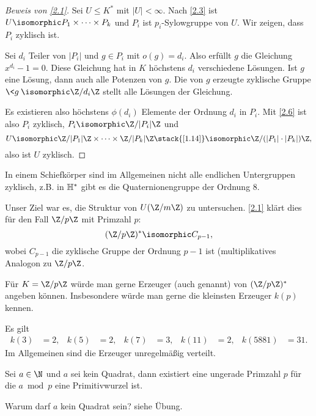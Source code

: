 \begin{proof}[Beweis von \ref{2.1}]
	Sei $U \le K^*$ mit $|U| < \infty$.
	Nach \ref{2.3} ist $U \isomorphic P_1 \times \dotsb \times P_k$ und $P_i$ ist $p_i$-Sylowgruppe von $U$.
	Wir zeigen, dass $P_i$ zyklisch ist.

	Sei $d_i$ Teiler von $|P_i|$ und $g \in P_i$ mit $o(g) = d_i$.
	Also erfüllt $g$ die Gleichung $x^{d_i} - 1 = 0$.
	Diese Gleichung hat in $K$ höchstens $d_i$ verschiedene Lösungen.
	Ist $g$ eine Lösung, dann auch alle Potenzen von $g$.
	Die von $g$ erzeugte zyklische Gruppe $\<g\> \isomorphic \Z / d_i \Z$ stellt alle Lösungen der Gleichung.

	Es existieren also höchstens $\phi(d_i)$ Elemente der Ordnung $d_i$ in $P_i$.
	Mit \ref{2.6} ist also $P_i$ zyklisch, $P_i \isomorphic \Z / |P_i| \Z$ und
	\[
		U \isomorphic
		\Z / |P_1| \Z \times \dotsb \times \Z / |P_k| \Z
		\stack{\ref{1.14}}\isomorphic
		\Z / (|P_1| \cdot |P_k|) \Z,
	\]
	also ist $U$ zyklisch.
\end{proof}
\begin{note}
	In einem Schiefkörper sind im Allgemeinen nicht alle endlichen Untergruppen zyklisch, z.B. in $\mathbb{H}^*$ gibt es die Quaternionengruppe der Ordnung $8$.
\end{note}

Unser Ziel war es, die Struktur von $U(\Z / m \Z)$ zu untersuchen.
\ref{2.1} klärt dies für den Fall $\Z / p\Z$ mit Primzahl $p$:
\[
	(\Z / p \Z)^* \isomorphic C_{p-1},
\]
wobei $C_{p-1}$ die zyklische Gruppe der Ordnung $p-1$ ist (multiplikatives Analogon zu $\Z / p \Z$.

\begin{nt*}
	Für $K = \Z / p\Z$ würde man gerne Erzeuger (auch  genannt) von $(\Z / p\Z)^*$ angeben können.
	Insbesondere würde man gerne die kleinsten Erzeuger $k(p)$ kennen.
\end{nt*}

\begin{ex*}
	Es gilt
	\begin{align*}
		k(3) &= 2, &
		k(5) &= 2, &
		k(7) &= 3, &
		k(11) &= 2, &
		k(5881) &= 31.
	\end{align*}
	Im Allgemeinen sind die Erzeuger unregelmäßig verteilt.
\end{ex*}

\begin{conj}[E. Artin]
	Sei $a \in \N$ und $a$ sei kein Quadrat, dann existiert eine ungerade Primzahl $p$ für die $a \bmod p$ eine Primitivwurzel ist.
	\begin{note}
		Warum darf $a$ kein Quadrat sein?
		siehe Übung.
	\end{note}
\end{conj}


